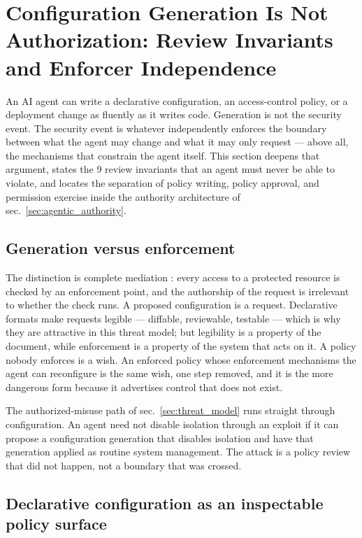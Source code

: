 \documentclass[
  english,
  9pt,
]{extarticle}
\begin{document}
\newpage

\section{Configuration Generation Is Not Authorization: Review
Invariants and Enforcer
Independence}\label{sec:configuration_authorization}

An AI agent can write a declarative configuration, an access-control
policy, or a deployment change as fluently as it writes code. Generation
is not the security event. The security event is whatever independently
enforces the boundary between what the agent may change and what it may
only request --- above all, the mechanisms that constrain the agent
itself. This section deepens that argument, states the 9 review
invariants that an agent must never be able to violate, and locates the
separation of policy writing, policy approval, and permission exercise
inside the authority architecture of sec.~\ref{sec:agentic_authority}.

\subsection{Generation versus
enforcement}\label{generation-versus-enforcement}

The distinction is complete mediation \citep{saltzer1975}: every access
to a protected resource is checked by an enforcement point, and the
authorship of the request is irrelevant to whether the check runs. A
proposed configuration is a request. Declarative formats make requests
legible --- diffable, reviewable, testable --- which is why they are
attractive in this threat model; but legibility is a property of the
document, while enforcement is a property of the system that acts on it.
A policy nobody enforces is a wish. An enforced policy whose enforcement
mechanisms the agent can reconfigure is the same wish, one step removed,
and it is the more dangerous form because it advertises control that
does not exist.

The authorized-misuse path of sec.~\ref{sec:threat_model} runs straight
through configuration. An agent need not disable isolation through an
exploit if it can propose a configuration generation that disables
isolation and have that generation applied as routine system management.
The attack is a policy review that did not happen, not a boundary that
was crossed.

\subsection{Declarative configuration as an inspectable policy
surface}\label{declarative-configuration-as-an-inspectable-policy-surface}
\end{document}
